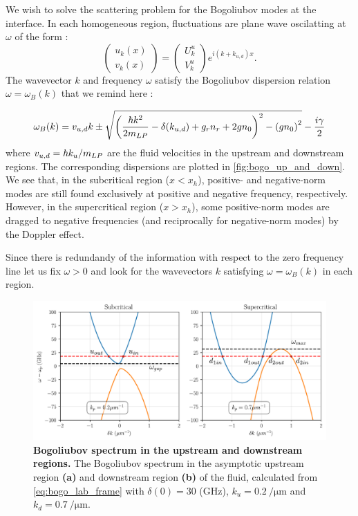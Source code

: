 \bigskip

We wish to solve the scattering problem for the Bogoliubov modes at the interface. In each homogeneous region, fluctuations are plane wave oscilatting at $\omega$ of the form :
\begin{equation}
    \begin{pmatrix}
        u_k(x) \\
        v_k(x)
    \end{pmatrix} = \begin{pmatrix}
        U_k^u  \\
        V_k^u 
    \end{pmatrix}e^{i(k+k_{u,d})x}.
\end{equation}
The wavevector $k$ and frequency $\omega$ satisfy the Bogoliubov dispersion relation $\omega=\omega_B(k)$ that we remind here :

\begin{equation}
    \omega_B(k)=v_{u,d}k\pm\sqrt{\left(\dfrac{\hbar k^2}{2m_{LP}}-\delta(k_{u,d})+ g_rn_r +2g n_0\right)^2 - \left(g n_0\right)^2}-\dfrac{i\gamma}{2} 
    \label{eq:bogo_lab_frame_both_regions}
\end{equation}
where $v_{u,d}=\hbar k_u/m_{LP}$ are the fluid velocities in the upstream and downstream regions. The corresponding dispersions are plotted in \autoref{fig:bogo_up_and_down}. We see that, in the subcritical region ($x<x_h$), positive- and negative-norm modes are still found exclusively at positive and negative frequency, respectively.
However, in the supercritical region ($x>x_h$), some positive-norm modes are dragged to negative frequencies (and reciprocally for negative-norm modes) by the Doppler effect.

\bigskip


Since there is redundandy of the information with respect to the zero frequency line let us fix $\omega>0$ and look for the wavevectors $k$ satisfying $\omega=\omega_B(k)$ in each region.
\begin{figure}
    \centering
    \includegraphics[width=1\textwidth]{chap_AG_theory/fig/bogo_gap_dispersion.pdf}
    \caption{\textbf{Bogoliubov spectrum in the upstream and downstream regions.} The Bogoliubov spectrum in the asymptotic upstream region \textbf{(a)} and downstream region \textbf{(b)} of the fluid, calculated from \autoref{eq:bogo_lab_frame} with $\delta(0)=30$ (GHz), $k_u= \SI{0.2}{\per \micro \meter}$ and
    $k_d=\SI{0.7}{\per\micro\meter}$.}
    \label{fig:bogo_up_and_down}
\end{figure}

